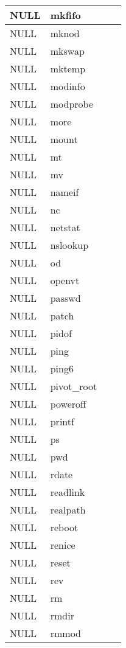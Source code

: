 \begin{longtable}{llp{60mm}p{60mm}}
     \hline
      NULL& mkfifo \\
     \hline
      NULL& mknod \\
     \hline
      NULL& mkswap \\
     \hline
      NULL& mktemp \\
     \hline
      NULL& modinfo \\
     \hline
      NULL& modprobe \\
     \hline
      NULL& more \\
     \hline
      NULL& mount \\
     \hline
      NULL& mt \\
     \hline
      NULL& mv \\
     \hline
      NULL& nameif \\
     \hline
      NULL& nc \\
     \hline
      NULL& netstat \\
     \hline
      NULL& nslookup \\
     \hline
      NULL& od \\
     \hline
      NULL& openvt \\
     \hline
      NULL& passwd \\
     \hline
      NULL& patch \\
     \hline
      NULL& pidof \\
     \hline
      NULL& ping \\
     \hline
      NULL& ping6 \\
     \hline
      NULL& pivot\_root \\
     \hline
      NULL& poweroff \\
     \hline
      NULL& printf \\
     \hline
      NULL& ps \\
     \hline
      NULL& pwd \\
     \hline
      NULL& rdate \\
     \hline
      NULL& readlink \\
     \hline
      NULL& realpath \\
     \hline
      NULL& reboot \\
     \hline
      NULL& renice \\
     \hline
      NULL& reset \\
     \hline
      NULL& rev \\
     \hline
      NULL& rm \\
     \hline
      NULL& rmdir \\
     \hline
      NULL& rmmod \\

\end{longtable}
